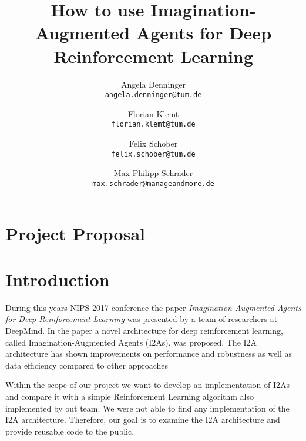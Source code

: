 \documentclass[10pt,twocolumn,letterpaper]{article}
\begin{document}
\title{How to use Imagination-Augmented Agents for Deep Reinforcement Learning}

\author{Angela Denninger\\
{\tt\small angela.denninger@tum.de}
\and
Florian Klemt\\
{\tt\small florian.klemt@tum.de}
\and
Felix Schober\\
{\tt\small felix.schober@tum.de}
\and
Max-Philipp Schrader\\
{\tt\small max.schrader@manageandmore.de}
}


\maketitle

%
%
\section*{Project Proposal}

\section{Introduction}
    During this years NIPS 2017 conference the paper \textit{Imagination-Augmented Agents for Deep Reinforcement Learning} \cite{NIPS2017_7152} was presented by a team of researchers at DeepMind. In the paper a novel architecture for deep reinforcement learning, called Imagination-Augmented Agents (I2As), was proposed. The I2A architecture has shown improvements on performance and robustness as well as data efficiency compared to other approaches
   
    Within the scope of our project we want to develop an implementation of I2As and compare it with a simple Reinforcement Learning algorithm also implemented by out team.
    We were not able to find any implementation of the I2A architecture. Therefore, our goal is to examine the I2A architecture and provide reusable code to the public.
\end{document}
